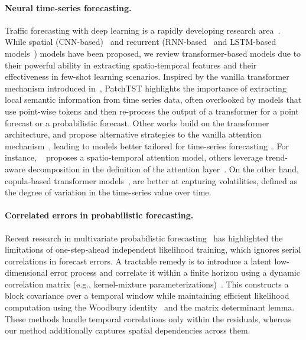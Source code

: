\documentclass{article}
\theoremstyle{plain}
\theoremstyle{definition}
\theoremstyle{remark}
\begin{document}
\paragraph{Neural time-series forecasting.}
Traffic forecasting with deep learning is a rapidly developing research area~\cite{Benidis_2022}. While spatial (CNN-based)~\cite{Song_Lin_Guo_Wan_2020, ijcai2019p264} and recurrent (RNN-based~\cite{Zheng_Fan_Wang_Qi_2020} and LSTM-based models~\cite{salinas2019highdimensional, shang2021discrete}) models have been proposed, we review transformer-based models due to their powerful ability in extracting spatio-temporal features and their effectiveness in few-shot learning scenarios.
Inspired by the vanilla transformer mechanism introduced in~\cite{vaswani2023attention}, PatchTST \cite{nie2023time} highlights the importance of extracting local semantic information from time series data, often overlooked by models that use point-wise tokens and then re-process the output of a transformer for a point forecast or a probabilistic forecast. Other works build on the transformer architecture, and propose alternative strategies to the vanilla attention mechanism~\cite{moghadas2022statnet},
leading to models better tailored for time-series forecasting~\cite{lim2020temporal, oreshkin2020nbeats, zhou2021informer}. For instance, ~\cite{moghadas2022statnet} proposes a spatio-temporal attention  model, others leverage trend-aware decomposition in the definition of the attention layer~\cite{wu2022autoformer, woo2022etsformer, liu2022pyraformer, zhou2022fedformer, ni2024basisformer, li2020enhancing}. On the other hand, copula-based transformer models~\cite{ashok2024tactis2}, are better at capturing volatilities, defined as the degree of variation in the time-series value over time. 

\paragraph{Correlated errors in probabilistic forecasting.}
Recent research in multivariate probabilistic forecasting~\cite{zheng2024multivariateprobabilistictimeseries} has highlighted the limitations of one-step-ahead independent likelihood training, which ignores serial correlations in forecast errors. A tractable remedy is to introduce a latent low-dimensional error process and correlate it within a finite horizon using a dynamic correlation matrix (e.g., kernel-mixture parameterizations)~\cite{zheng2024multivariateprobabilistictimeseries}. This constructs a block covariance over a temporal window while maintaining efficient likelihood computation using the Woodbury identity~\cite{MR1927606} and the matrix determinant lemma. {These methods handle temporal correlations only within the residuals, whereas our method additionally captures spatial dependencies across them.} 
\end{document}

